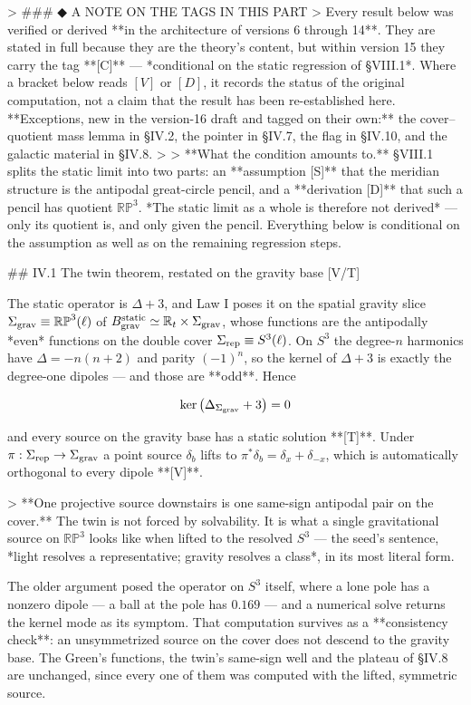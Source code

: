 > ### ◆ A NOTE ON THE TAGS IN THIS PART
> Every result below was verified or derived **in the architecture of versions 6 through 14**. They are stated in full because they are the theory's content, but within version 15 they carry the tag **[C]** — *conditional on the static regression of §VIII.1*. Where a bracket below reads $[V]$ or $[D]$, it records the status of the original computation, not a claim that the result has been re-established here. **Exceptions, new in the version-16 draft and tagged on their own:** the cover–quotient mass lemma in §IV.2, the pointer in §IV.7, the flag in §IV.10, and the galactic material in §IV.8.
>
> **What the condition amounts to.** §VIII.1 splits the static limit into two parts: an **assumption [S]** that the meridian structure is the antipodal great-circle pencil, and a **derivation [D]** that such a pencil has quotient $\mathbb{RP}^3$. *The static limit as a whole is therefore not derived* — only its quotient is, and only given the pencil. Everything below is conditional on the assumption as well as on the remaining regression steps.

## IV.1 The twin theorem, restated on the gravity base [V/T]

The static operator is $\Delta+3$, and Law I poses it on the spatial gravity slice $\Sigma_{\rm grav}\equiv\mathbb{RP}^3(\ell)$ of $B_{\rm grav}^{\rm static}\simeq\mathbb{R}_t\times\Sigma_{\rm grav}$, whose functions are the antipodally *even* functions on the double cover $\Sigma_{\rm rep}\equiv S^3(\ell)$. On $S^3$ the degree-$n$ harmonics have $\Delta = -n(n+2)$ and parity $(-1)^n$, so the kernel of $\Delta+3$ is exactly the degree-one dipoles — and those are **odd**. Hence

$$\ker\big(\Delta_{\Sigma_{\rm grav} }+3\big) = 0$$

and every source on the gravity base has a static solution **[T]**. Under $\pi:\Sigma_{\rm rep}\to\Sigma_{\rm grav}$ a point source $\delta_b$ lifts to $\pi^*\delta_b = \delta_x+\delta_{-x}$, which is automatically orthogonal to every dipole **[V]**.

> **One projective source downstairs is one same-sign antipodal pair on the cover.** The twin is not forced by solvability. It is what a single gravitational source on $\mathbb{RP}^3$ looks like when lifted to the resolved $S^3$ — the seed's sentence, *light resolves a representative; gravity resolves a class*, in its most literal form.

The older argument posed the operator on $S^3$ itself, where a lone pole has a nonzero dipole — a ball at the pole has $0.169$ — and a numerical solve returns the kernel mode as its symptom. That computation survives as a **consistency check**: an unsymmetrized source on the cover does not descend to the gravity base. The Green's functions, the twin's same-sign well and the plateau of §IV.8 are unchanged, since every one of them was computed with the lifted, symmetric source.

